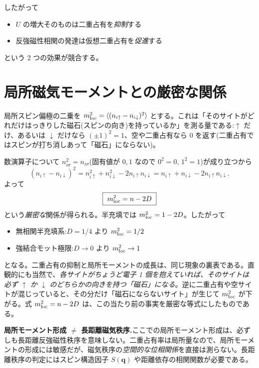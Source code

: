 \documentclass[11pt,a4paper]{ltjsarticle}
\newcommand{\ev}[1]{\langle #1\rangle}
\newcommand{\up}{\uparrow}
\newcommand{\dn}{\downarrow}
\begin{document}
したがって
\begin{itemize}
  \item $U$ の増大そのものは二重占有を\emph{抑制}する
  \item 反強磁性相関の発達は仮想二重占有を\emph{促進}する
\end{itemize}
という 2 つの効果が競合する。

\section{局所磁気モーメントとの厳密な関係}
\label{sec:moment}

局所スピン偏極の二乗を $m_{\rm loc}^2=\ev{(n_{i\up}-n_{i\dn})^2}$ とする。これは「そのサイトがどれだけはっきりした磁石(スピンの向き)を持っているか」を測る量である:$\up$ だけ、あるいは $\dn$ だけなら $(\pm1)^2=1$、空や二重占有なら $0$ を返す(二重占有ではスピンが打ち消しあって「磁石」にならない)。

数演算子について $n_{i\sigma}^2=n_{i\sigma}$(固有値が $0,1$ なので $0^2=0$, $1^2=1$)が成り立つから
\begin{equation}
  (n_{i\up}-n_{i\dn})^2 = n_{i\up}^2 + n_{i\dn}^2 - 2n_{i\up}n_{i\dn}
  = n_{i\up}+n_{i\dn}-2n_{i\up}n_{i\dn}.
\end{equation}
よって
\begin{equation}
  \boxed{\ m_{\rm loc}^2 = n - 2D\ }
\end{equation}
という\emph{厳密な}関係が得られる。半充填では $m_{\rm loc}^2=1-2D$。したがって
\begin{itemize}
  \item 無相関半充填系:$D=1/4$ より $m_{\rm loc}^2=1/2$
  \item 強結合モット極限:$D\to0$ より $m_{\rm loc}^2\to1$
\end{itemize}
となる。二重占有の抑制と局所モーメントの成長は、同じ現象の裏表である。直観的にも当然で、\emph{各サイトがちょうど電子 1 個を抱えていれば、そのサイトは必ず $\up$ か $\dn$ のどちらかの向きを持つ「磁石」になる}。逆に二重占有や空サイトが混じっていると、その分だけ「磁石にならないサイト」が生じて $m_{\rm loc}^2$ が下がる。式 $m_{\rm loc}^2=n-2D$ は、この当たり前の事実を厳密な等式にしたものである。

\begin{cautionbox}
\textbf{局所モーメント形成 $\neq$ 長距離磁気秩序.}ここでの局所モーメント形成は、必ずしも長距離反強磁性秩序を意味しない。二重占有率は局所量なので、局所モーメントの形成には敏感だが、磁気秩序の\emph{空間的な位相関係}を直接は測らない。長距離秩序の判定にはスピン構造因子 $S(\mathbf q)$ や距離依存の相関関数が必要である。
\end{cautionbox}
\end{document}
